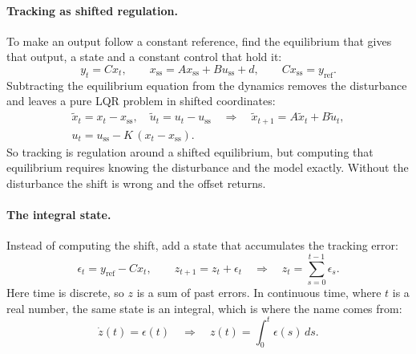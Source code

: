 \documentclass[11pt]{article}
\begin{document}
\paragraph{Tracking as shifted regulation.} To make an output follow a constant reference, find the
equilibrium that gives that output, a state and a constant control that hold it:
\[
  y_t = C x_t, \qquad x_{\mathrm{ss}} = A x_{\mathrm{ss}} + B u_{\mathrm{ss}} + d, \qquad
  C x_{\mathrm{ss}} = y_{\mathrm{ref}} .
\]
Subtracting the equilibrium equation from the dynamics removes the disturbance and leaves a pure LQR
problem in shifted coordinates:
\begin{gather*}
  \tilde x_t = x_t - x_{\mathrm{ss}}, \quad \tilde u_t = u_t - u_{\mathrm{ss}}
  \quad\Longrightarrow\quad
  \tilde x_{t+1} = A \tilde x_t + B \tilde u_t, \\
  u_t = u_{\mathrm{ss}} - K\,(x_t - x_{\mathrm{ss}}) .
\end{gather*}
So tracking is regulation around a shifted equilibrium, but computing that equilibrium requires
knowing the disturbance and the model exactly. Without the disturbance the shift is wrong and the
offset returns.

\paragraph{The integral state.} Instead of computing the shift, add a state that accumulates the
tracking error:
\[
  \epsilon_t = y_{\mathrm{ref}} - C x_t, \qquad z_{t+1} = z_t + \epsilon_t
  \quad\Longrightarrow\quad z_t = \sum_{s=0}^{t-1} \epsilon_s .
\]
Here time is discrete, so $z$ is a sum of past errors. In continuous time, where $t$ is a real
number, the same state is an integral, which is where the name comes from:
\[
  \dot z(t) = \epsilon(t) \quad\Longrightarrow\quad z(t) = \int_0^t \epsilon(s)\, ds .
\]
\end{document}
